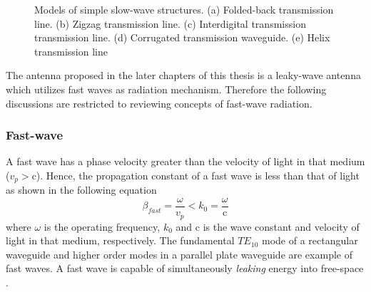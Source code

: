 \begin{figure} [t!]
\hspace*{\fill}
\hspace*{\fill}
  \caption[Models of simple slow-wave structures including folded-back transmission line, zigzag transmission line, interdigital transmission transmission line, corrugated transmission waveguide, and helix transmission line.]{Models of simple slow-wave structures. (a) Folded-back transmission line. (b) Zigzag transmission line. (c) Interdigital transmission transmission line. (d) Corrugated transmission waveguide. (e) Helix transmission line}
\label{fig:slowstrcture}
\end{figure}

The antenna proposed in the later chapters of this thesis is a leaky-wave antenna which utilizes fast waves as radiation mechanism. Therefore the following discussions are restricted to reviewing concepts of fast-wave radiation. 

\subsubsection{Fast-wave}
A fast wave has a phase velocity greater than the velocity of light in that medium ($v_p > \mathrm{c}$). Hence, the propagation constant of a fast wave is less than that of light as shown in the following equation
%
\begin{equation}
  \beta_{fast}= \dfrac{\omega}{v_p}  < k_0= \dfrac{\omega}{\mathrm{c}} 
\end{equation}
%
where $\omega $ is the operating frequency, $k_0$ and $\mathrm{c}$ is the wave constant and velocity of light in that medium, respectively. The fundamental $TE_{10}$ mode of a rectangular waveguide and higher order modes in a parallel plate waveguide are example of fast waves. A fast wave is capable of simultaneously \textit{leaking} energy into free-space \cite{Neto2010}\cite{felsen1994}.%

